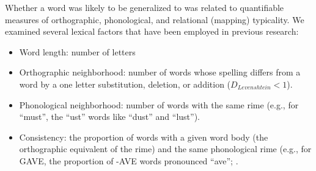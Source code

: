 \documentclass[10pt,letterpaper]{article}
\begin{document}
Whether a word was likely to be generalized to was related to quantifiable measures of orthographic, phonological, and relational (mapping) typicality.
We examined several lexical factors that have been employed in previous research:
\begin{itemize}
	\item Word length: number of letters 
	\item Orthographic neighborhood: number of words whose spelling differs from a word by a one letter substitution, deletion, or addition  ($D_{Levenshtein} < 1$).
	\item Phonological neighborhood: number of words with the same rime (e.g., for ``must'', the ``ust'' words like ``dust'' and ``lust'').
	\item Consistency: the proportion of words with a given word body (the orthographic equivalent of the rime) and the same phonological rime (e.g., for GAVE, the proportion of -AVE words pronounced ``ave''; \cite{Plaut1996}.
\end{itemize}

\end{document}
